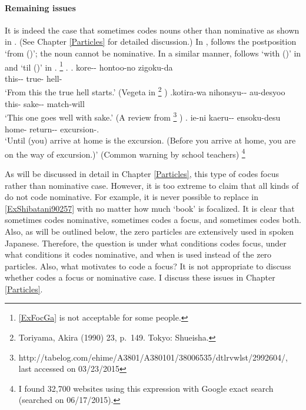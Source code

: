 \paragraph{Remaining issues}

It is indeed the case that
 sometimes codes nouns other than nominative
as shown in \Next.
(See Chapter \ref{Particles} for detailed discussion.)
In \Next[a],  follows the postposition  `from ()';
the noun cannot be nominative.
In a similar manner,
 follows  `with ()' in \Next[b] and
 `til ()' in \Next[c].%
 \footnote{\ref{ExFocGa} is not acceptable for some people.}
%
\ex.
 \ag. kore-- hontoo-no zigoku-da \\
      this-- true- hell- \\
      `From this the true hell starts.'
      \hfill{(Vegeta in %
      \footnote{
      Toriyama, Akira (1990)  23, p.~149. Tokyo: Shueisha.
      }
      )}
 \bg.\label{ExFocGa}kotira-wa nihonsyu-- au-desyoo \\
      this- sake-- match-will \\
      `This one goes well with sake.'
      \hfill{(A review from %
       \footnote{http://tabelog.com/ehime/A3801/A380101/38006535/dtlrvwlst/2992604/, last accessed on 03/23/2015}
      )}
  \bg. ie-ni kaeru-- ensoku-desu \\
       home- return-- excursion-. \\
       `Until (you) arrive at home is the excursion. (Before you arrive at home, you are on the way of excursion.)'
       \hfill{(Common warning by school teachers)}%
       \footnote{
       I found 32,700 websites using this expression with Google exact search (searched on 06/17/2015).
       }

As will be discussed in detail in Chapter \ref{Particles},
this type of  codes focus rather than nominative case.
However, it is too extreme to claim that all kinds of  do not code nominative.
For example, it is never possible to replace
 in \ref{ExShibatani90257} with 
no matter how much  `book' is focalized.
It is clear that  sometimes codes nominative, sometimes codes a focus, and sometimes codes both.
Also, as will be outlined below,
the zero particles are extensively used in spoken Japanese.
Therefore, the question is under what conditions  codes focus,
under what conditions it codes nominative,
and when  is used instead of the zero particles.
Also, what motivates  to code a focus?
It is not appropriate to discuss
whether  codes a focus or nominative case.
I discuss these issues in Chapter \ref{Particles}.



